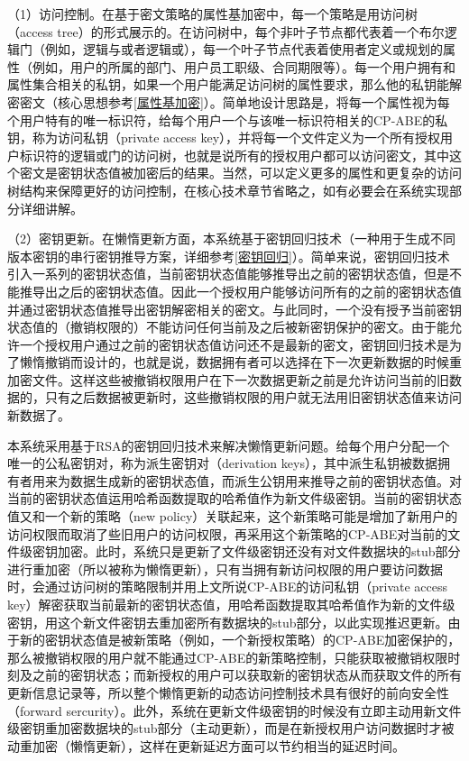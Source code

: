 \documentclass[promaster]{thesis-uestc}
\begin{document}
（1）访问控制。在基于密文策略的属性基加密中，每一个策略是用访问树（access tree）的形式展示的。在访问树中，每个非叶子节点都代表着一个布尔逻辑门（例如，逻辑与或者逻辑或），每一个叶子节点代表着使用者定义或规划的属性（例如，用户的所属的部门、用户员工职级、合同期限等）。每一个用户拥有和属性集合相关的私钥，如果一个用户能满足访问树的属性要求，那么他的私钥能解密密文（核心思想参考\ref{属性基加密}）。简单地设计思路是，将每一个属性视为每个用户特有的唯一标识符，给每个用户一个与该唯一标识符相关的CP-ABE的私钥，称为访问私钥（private access key），并将每一个文件定义为一个所有授权用户标识符的逻辑或门的访问树，也就是说所有的授权用户都可以访问密文，其中这个密文是密钥状态值被加密后的结果。当然，可以定义更多的属性和更复杂的访问树结构来保障更好的访问控制，在核心技术章节省略之，如有必要会在系统实现部分详细讲解。

（2）密钥更新。在懒惰更新方面，本系统基于密钥回归技术（一种用于生成不同版本密钥的串行密钥推导方案，详细参考\ref{密钥回归}）。简单来说，密钥回归技术引入一系列的密钥状态值，当前密钥状态值能够推导出之前的密钥状态值，但是不能推导出之后的密钥状态值。因此一个授权用户能够访问所有的之前的密钥状态值并通过密钥状态值推导出密钥解密相关的密文。与此同时，一个没有授予当前密钥状态值的（撤销权限的）不能访问任何当前及之后被新密钥保护的密文。由于能允许一个授权用户通过之前的密钥状态值访问还不是最新的密文，密钥回归技术是为了懒惰撤销而设计的，也就是说，数据拥有者可以选择在下一次更新数据的时候重加密文件。这样这些被撤销权限用户在下一次数据更新之前是允许访问当前的旧数据的，只有之后数据被更新时，这些撤销权限的用户就无法用旧密钥状态值来访问新数据了。

本系统采用基于RSA的密钥回归技术来解决懒惰更新问题。给每个用户分配一个唯一的公私密钥对，称为派生密钥对（derivation keys），其中派生私钥被数据拥有者用来为数据生成新的密钥状态值，而派生公钥用来推导之前的密钥状态值。对当前的密钥状态值运用哈希函数提取的哈希值作为新文件级密钥。当前的密钥状态值又和一个新的策略（new policy）关联起来，这个新策略可能是增加了新用户的访问权限而取消了些旧用户的访问权限，再采用这个新策略的CP-ABE对当前的文件级密钥加密。此时，系统只是更新了文件级密钥还没有对文件数据块的stub部分进行重加密（所以被称为懒惰更新），只有当拥有新访问权限的用户要访问数据时，会通过访问树的策略限制并用上文所说CP-ABE的访问私钥（private access key）解密获取当前最新的密钥状态值，用哈希函数提取其哈希值作为新的文件级密钥，用这个新文件密钥去重加密所有数据块的stub部分，以此实现推迟更新。由于新的密钥状态值是被新策略（例如，一个新授权策略）的CP-ABE加密保护的，那么被撤销权限的用户就不能通过CP-ABE的新策略控制，只能获取被撤销权限时刻及之前的密钥状态；而新授权的用户可以获取新的密钥状态从而获取文件的所有更新信息记录等，所以整个懒惰更新的动态访问控制技术具有很好的前向安全性（forward sercurity）。此外，系统在更新文件级密钥的时候没有立即主动用新文件级密钥重加密数据块的stub部分（主动更新），而是在新授权用户访问数据时才被动重加密（懒惰更新），这样在更新延迟方面可以节约相当的延迟时间。
\end{document}
